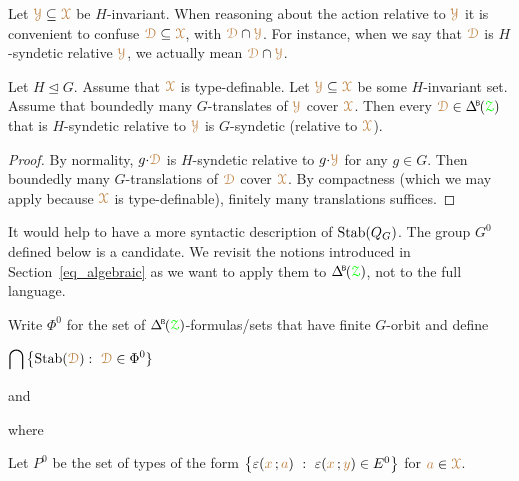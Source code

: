 
Let ${\color{brown}\EuScript Y}\subseteq{\color{brown}\EuScript X}$ be $H$-invariant.
When reasoning about the action relative to ${\color{brown}\EuScript Y}$ it is convenient to confuse ${\color{brown}\EuScript D}\subseteq{\color{brown}\EuScript X}$, with ${\color{brown}\EuScript D}\cap{\color{brown}\EuScript Y}$.
For instance, when we say that ${\color{brown}\EuScript D}$ is $H$-syndetic relative ${\color{brown}\EuScript Y}$, we actually mean ${\color{brown}\EuScript D}\cap{\color{brown}\EuScript Y}$.

\begin{proposition}\label{prop_HgenGgen}
  Let $H\trianglelefteq G$.
  Assume that ${\color{brown}\EuScript X}$ is type-definable.
  Let ${\color{brown}\EuScript Y}\subseteq{\color{brown}\EuScript X}$ be some $H$-invariant set.
  Assume that boundedly many $G$-translates of ${\color{brown}\EuScript Y}$ cover ${\color{brown}\EuScript X}$.
  Then every $\mrD\in\BDelta(\grZ)$ that is $H$-syndetic relative to ${\color{brown}\EuScript Y}$ is $G$-syndetic (relative to ${\color{brown}\EuScript X}$).
\end{proposition}

\begin{proof}
%
  By normality, $g{\cdot}{\color{brown}\EuScript D}$ is $H$-syndetic relative to $g{\cdot}{\color{brown}\EuScript Y}$ for any $g\in G$.
  Then boundedly many $G$-translations of ${\color{brown}\EuScript D}$ cover ${\color{brown}\EuScript X}$.
  By compactness (which we may apply because ${\color{brown}\EuScript X}$ is type-definable), finitely many translations suffices.
\end{proof}

It would help to have a more syntactic description of ${\rm Stab}(Q_G)$.
The group $G^0$ defined below is a candidate. %
We revisit the notions introduced in Section~\ref{eq_algebraic} as we want to apply them to $\BDelta(\grZ)$, not to the full language.%

\begin{definition}\label{def_G0}
  Write \emph{$\Phi^0$\/} for the set of $\BDelta(\grZ)$-formulas/sets that have finite $G$-orbit and define%

  \medrel{=}$\displaystyle\bigcap\big\{{\rm Stab}({\color{brown}\EuScript D}) :\  {\color{brown}\EuScript D}\in\Phi^0\}$

  and%

  
  where%


  Let $P^0$ be the set of types of the form $\big\{\varepsilon({\color{brown} x}\,;{\color{brown} a})\ :\ \varepsilon({\color{brown} x}\,;{\color{brown} y})\in E^0\big\}$ for ${\color{brown} a}\in{\color{brown}\EuScript X}$.
\end{definition}

